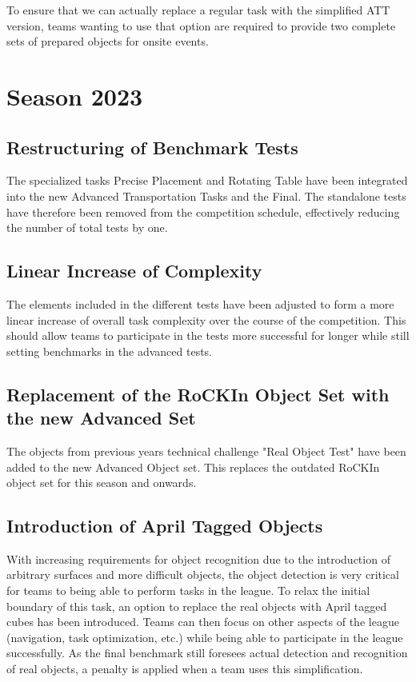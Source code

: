To ensure that we can actually replace a regular task with the simplified ATT version,
teams wanting to use that option are required to provide two complete sets of prepared objects for onsite events.

\section{Season 2023}

\subsection{Restructuring of Benchmark Tests}

The specialized tasks Precise Placement and Rotating Table have been integrated into the new Advanced Transportation Tasks and the Final.
The standalone tests have therefore been removed from the competition schedule, effectively reducing the number of total tests by one.

\subsection{Linear Increase of Complexity}

The elements included in the different tests have been adjusted to form a more linear increase of overall task complexity over the course of the competition. This should allow teams to participate in the tests more successful for longer while still setting benchmarks in the advanced tests.

\subsection{Replacement of the RoCKIn Object Set with the new Advanced Set}

The objects from previous years technical challenge "Real Object Test" have been added to the new Advanced Object set. This replaces the outdated RoCKIn object set for this season and onwards.

\subsection{Introduction of April Tagged Objects}

With increasing requirements for object recognition due to the introduction of arbitrary surfaces and more difficult objects, the object detection is very critical for teams to being able to perform tasks in the league. To relax the initial boundary of this task, an option to replace the real objects with April tagged cubes has been introduced. Teams can then focus on other aspects of the league (navigation, task optimization, etc.) while being able to participate in the league successfully. As the final benchmark still foresees actual detection and recognition of real objects, a penalty is applied when a team uses this simplification.

